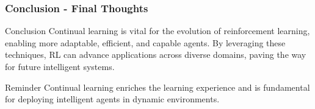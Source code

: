\documentclass[aspectratio=169]{beamer}
\begin{document}
\begin{frame}[fragile]
    \frametitle{Conclusion - Final Thoughts}
    
    \begin{block}{Conclusion}
        Continual learning is vital for the evolution of reinforcement learning, enabling more adaptable, efficient, and capable agents. By leveraging these techniques, RL can advance applications across diverse domains, paving the way for future intelligent systems.
    \end{block}
    
    \begin{block}{Reminder}
        Continual learning enriches the learning experience and is fundamental for deploying intelligent agents in dynamic environments.
    \end{block}
\end{frame}
\end{document}
